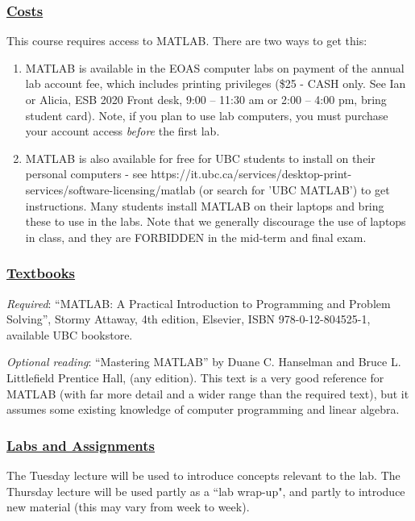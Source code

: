 \documentclass[12pt]{article}
\renewcommand{\section}[1]{\vspace{0pt}\subsubsection*{\underline{\large #1}}\vspace{-10pt}}
\begin{document}
\section{Costs}
This course requires access to MATLAB. There are two ways to get this:
\begin{enumerate}
\item MATLAB is available  in the EOAS computer labs on payment of the annual lab
account fee, which includes printing privileges (\$25 - CASH only.  See Ian or 
Alicia, ESB 2020 Front desk, 9:00 -- 11:30 am or 2:00 -- 4:00 pm, bring student card). 
 Note, if you
plan to use lab computers, you must purchase your account access \emph{before} the first lab.

\item MATLAB is also available for free for UBC students to install on their personal computers - see https://it.ubc.ca/services/desktop-print-services/software-licensing/matlab
(or search for 'UBC MATLAB')  to get instructions.  Many students install MATLAB on their laptops and bring
these to use in the labs.  Note that we generally discourage the use of laptops in class, and they are FORBIDDEN in 
the mid-term and final exam. 
 \end{enumerate} 
  
 \newpage
\section{Textbooks}

{\em Required}: ``MATLAB: A Practical Introduction to Programming and Problem Solving'', Stormy Attaway, 4th edition, Elsevier, ISBN 978-0-12-804525-1, available UBC bookstore.


{\em Optional reading}: ``Mastering MATLAB'' by Duane C. Hanselman and 
Bruce L. Littlefield Prentice Hall, (any edition). This text is
a very good reference for MATLAB (with far more detail and a wider range
than the required text), but it assumes some existing knowledge of
computer programming and linear algebra.

\section{Labs and Assignments}

The Tuesday lecture will be used to introduce concepts relevant to the lab.
The Thursday lecture will be used partly as a ``lab wrap-up", and partly
to introduce new material (this may vary from week to week). 
\end{document}

